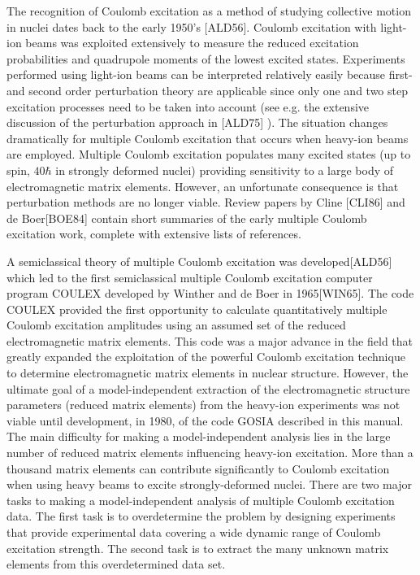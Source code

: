 \documentclass[10pt]{article}
\begin{document}
The recognition of Coulomb excitation as a method of studying collective motion in nuclei dates back to the early 1950's [ALD56]. Coulomb excitation with light-ion beams was exploited extensively to measure the reduced excitation probabilities and quadrupole moments of the lowest excited states. Experiments performed using light-ion beams can be interpreted relatively easily because first- and second order perturbation theory are applicable since only one and two step excitation processes need to be taken into account (see e.g. the extensive discussion of the perturbation approach in [ALD75] ). The situation changes dramatically for multiple Coulomb excitation that occurs when heavy-ion beams are employed. Multiple Coulomb excitation populates many excited states (up to spin, $40 \hbar$ in strongly deformed nuclei) providing sensitivity to a large body of electromagnetic matrix elements. However, an unfortunate consequence is that perturbation methods are no longer viable. Review papers by Cline [CLI86] and de Boer[BOE84] contain short summaries of the early multiple Coulomb excitation work, complete with extensive lists of references.

A semiclassical theory of multiple Coulomb excitation was developed[ALD56] which led to the first semiclassical multiple Coulomb excitation computer program COULEX developed by Winther and de Boer in 1965[WIN65]. The code COULEX provided the first opportunity to calculate quantitatively multiple Coulomb excitation amplitudes using an assumed set of the reduced electromagnetic matrix elements. This code was a major advance in the field that greatly expanded the exploitation of the powerful Coulomb excitation technique to determine electromagnetic matrix elements in nuclear structure. However, the ultimate goal of a model-independent extraction of the electromagnetic structure parameters (reduced matrix elements) from the heavy-ion experiments was not viable until development, in 1980, of the code GOSIA described in this manual. The main difficulty for making a model-independent analysis lies in the large number of reduced matrix elements influencing heavy-ion excitation. More than a thousand matrix elements can contribute significantly to Coulomb excitation when using heavy beams to excite strongly-deformed nuclei. There are two major tasks to making a model-independent analysis of multiple Coulomb excitation data. The first task is to overdetermine the problem by designing experiments that provide experimental data covering a wide dynamic range of Coulomb excitation strength. The second task is to extract the many unknown matrix elements from this overdetermined data set.
\end{document}
